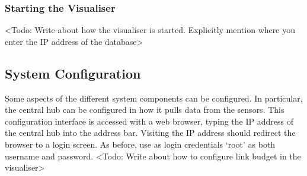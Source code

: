 \documentclass[../document.tex]{subfiles}
\begin{document}
\subsubsection{Starting the Visualiser}
{\color{red} <Todo: Write about how the visualiser is started. Explicitly mention where you enter the IP address of the database>}


\subsection{System Configuration}
Some aspects of the different system components can be configured. In particular, the central hub can be configured in how it pulls data from the sensors. This configuration interface is accessed with a web browser, typing the IP address of the central hub into the address bar. Visiting the IP address should redirect the browser to a login screen. As before, use as login credentials ‘root’ as both username and password.
{\color{red} <Todo: Write about how to configure link budget in the visualiser>}
\end{document}
